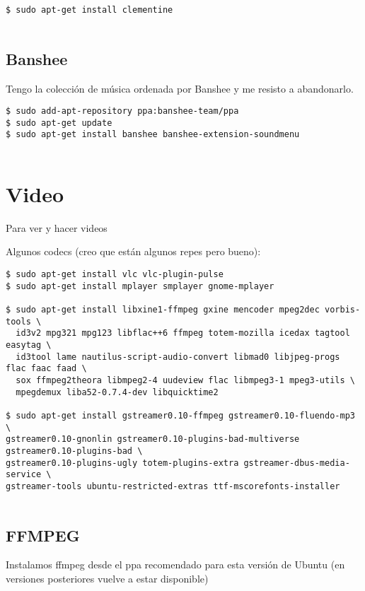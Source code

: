 \begin{verbatim}
$ sudo apt-get install clementine
      
\end{verbatim}

\subsection{Banshee}\label{banshee}

Tengo la colección de música ordenada por Banshee y me resisto a
abandonarlo.

\begin{verbatim}
$ sudo add-apt-repository ppa:banshee-team/ppa
$ sudo apt-get update
$ sudo apt-get install banshee banshee-extension-soundmenu
      
\end{verbatim}

\section{Video}\label{video}

Para ver y hacer videos

Algunos codecs (creo que están algunos repes pero bueno):

\begin{verbatim}
$ sudo apt-get install vlc vlc-plugin-pulse
$ sudo apt-get install mplayer smplayer gnome-mplayer

$ sudo apt-get install libxine1-ffmpeg gxine mencoder mpeg2dec vorbis-tools \
  id3v2 mpg321 mpg123 libflac++6 ffmpeg totem-mozilla icedax tagtool easytag \
  id3tool lame nautilus-script-audio-convert libmad0 libjpeg-progs flac faac faad \
  sox ffmpeg2theora libmpeg2-4 uudeview flac libmpeg3-1 mpeg3-utils \
  mpegdemux liba52-0.7.4-dev libquicktime2

$ sudo apt-get install gstreamer0.10-ffmpeg gstreamer0.10-fluendo-mp3 \
gstreamer0.10-gnonlin gstreamer0.10-plugins-bad-multiverse gstreamer0.10-plugins-bad \
gstreamer0.10-plugins-ugly totem-plugins-extra gstreamer-dbus-media-service \
gstreamer-tools ubuntu-restricted-extras ttf-mscorefonts-installer
   
\end{verbatim}

\subsection{FFMPEG}\label{ffmpeg}

Instalamos ffmpeg desde el ppa recomendado para esta versión de Ubuntu
(en versiones posteriores vuelve a estar disponible)

